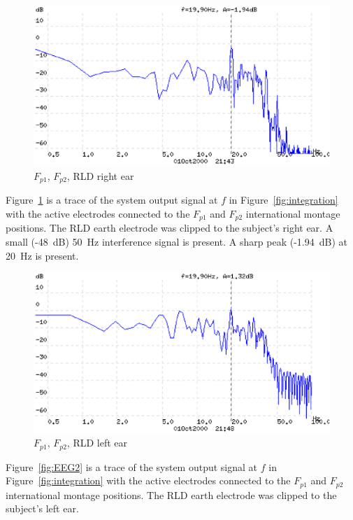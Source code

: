 \begin{figure}[htbp]
\begin{center}
	\includegraphics[width=\textwidth]{EEG1.ps} 
	\caption{$F_{p1}$, $F_{p2}$, RLD right ear}
    \label{fig:EEG1}
\end{center}
\end{figure}

Figure~\ref{fig:EEG1} is a trace of the system output signal at $f$ in
Figure~\ref{fig:integration} with the active electrodes connected to
the $F_{p1}$ and $F_{p2}$ international montage positions. The RLD
earth electrode was clipped to the subject's right ear. A small
(-48~dB) 50~Hz interference signal is present. A sharp peak (-1.94~dB)
at 20~Hz is present.

\begin{figure}[htbp]
\begin{center}
	\includegraphics[width=\textwidth]{EEG2.ps} 
	\caption{$F_{p1}$, $F_{p2}$, RLD left ear}
    \label{fig:EEG4}
\end{center}
\end{figure}

Figure~\ref{fig:EEG2} is a trace of the system output signal at $f$ in
Figure~\ref{fig:integration} with the active electrodes connected to
the $F_{p1}$ and $F_{p2}$ international montage positions. The RLD
earth electrode was clipped to the subject's left ear. 

